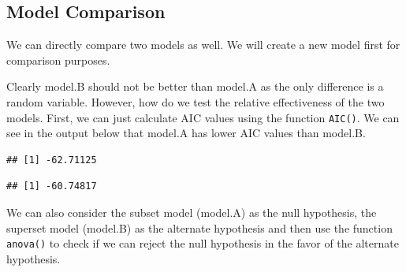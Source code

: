 \documentclass[10pt, letterpaper, twoside]{memoir}\usepackage{knitr}
\begin{document}
\subsection{Model Comparison}

We can directly compare two models as well. We will create a new model first for comparison purposes.

\begin{knitrout}
\color{fgcolor}\begin{kframe}
\begin{alltt}
\hlopt{$} \hlkwb{<-} \hlstd{(}  
 \hlkwb{<-} \hlstd{(} \hlopt{~}  \hlopt{+}   
 \hlkwb{<-} \hlstd{(} \hlopt{~}  \hlopt{+}  \hlopt{+} \hlopt{$}  
\end{alltt}
\end{kframe}
\end{knitrout}

Clearly model.B should not be better than model.A as the only difference is a random variable. However, how do we test the relative effectiveness of the two models. First, we can just calculate AIC values using the function \texttt{AIC()}. We can see in the output below that model.A has lower AIC values than model.B.

\begin{knitrout}
\color{fgcolor}\begin{kframe}
\begin{alltt}
\end{alltt}
\begin{verbatim}
## [1] -62.71125
\end{verbatim}
\begin{alltt}
\end{alltt}
\begin{verbatim}
## [1] -60.74817
\end{verbatim}
\end{kframe}
\end{knitrout}

We can also consider the subset model (model.A) as the null hypothesis, the superset model (model.B) as the alternate hypothesis and then use the function \texttt{anova()} to check if we can reject the null hypothesis in the favor of the alternate hypothesis.
\end{document}
